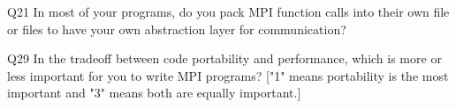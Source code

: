 \begin{description}%
\item{Q21} In most of your programs, do you pack MPI function calls into their own file or files to have your own abstraction layer for communication?%
\item{Q29} In the tradeoff between code portability and performance, which is more or less important for you to write MPI programs? ["1" means portability is the most important and "3" means both are equally important.]%
\end{description}%
